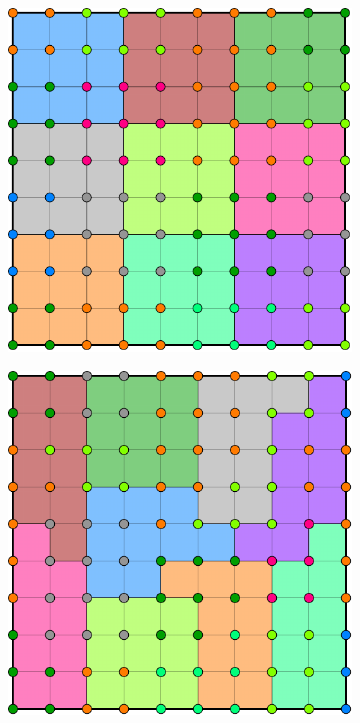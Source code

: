 \begin{figure}[htbp]
  \begin{subfigure}[t]{0.3\textwidth}
    \centerline{\includegraphics[width=0.9\linewidth]{figs/square_cart_struct_node_part}}
  \end{subfigure}
  \hfill
  \begin{subfigure}[t]{0.3\textwidth}
    \centerline{\includegraphics[width=0.9\linewidth]{figs/square_cart_metis_node_part}}

\end{subfigure}
\end{figure}
